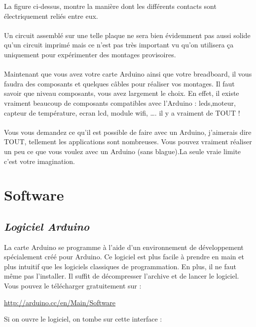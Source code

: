 \documentclass[12pt,a4paper]{article}
\begin{document}
\newpage
La figure ci-dessus, montre la manière dont les différents contacts sont électriquement reliés entre eux. 
\\
\\
Un circuit assemblé sur une telle plaque ne sera bien évidemment pas aussi solide qu’un circuit imprimé mais ce n’est pas très important vu qu’on utilisera ça uniquement pour expérimenter des montages provisoires.
\\
\\
Maintenant que vous avez votre carte Arduino ainsi que votre breadboard, il vous faudra des composants et quelques câbles pour réaliser vos montages. Il faut savoir que niveau composants, vous avez largement le choix.
En effet, il existe vraiment beaucoup de composants compatibles avec l’Arduino :
leds,moteur, capteur de température, ecran lcd, module wifi, …. il y a vraiment de TOUT !
\\
\\
Vous vous demandez ce qu’il est possible de faire avec un Arduino, j’aimerais dire TOUT, tellement les applications sont nombreuses. Vous pouvez vraiment réaliser un peu ce que vous voulez avec un Arduino (sans blague).La seule vraie limite c’est votre imagination.
\\
\newpage
\section{\LARGE Software}
\subsection{\textit{\textbf{Logiciel Arduino}}}
La carte Arduino se programme à l’aide d’un environnement de développement spécialement créé pour Arduino. Ce logiciel est plus facile à prendre en main et plus intuitif que les logiciels classiques de programmation.
En plus, il ne faut même pas l’installer. Il suffit de décompresser l’archive et de lancer le logiciel. Vous pouvez le télécharger gratuitement sur :


\begin{center}
\url{http://arduino.cc/en/Main/Software}
\end{center}

\bigskip
Si on ouvre le logiciel, on tombe sur cette interface : 
\end{document}
